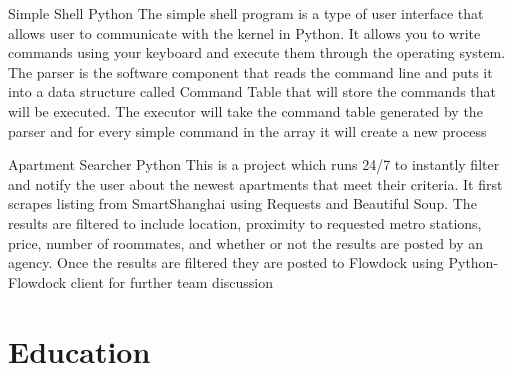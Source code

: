 \documentclass[11pt,a4paper]{moderncv}
\begin{document}
\vspace*{0.2\baselineskip}
\cventry{}
{Simple Shell}
{Python}
{}{}
{
The simple shell program is a type of user interface that allows user to communicate with the kernel in Python. It allows you to write commands using your keyboard and execute them through the operating system. The parser is the software component that reads the command line and puts it into a data structure called Command Table that will store the commands that will be executed. The executor will take the command table generated by the parser and for every simple command in the array it will create a new process
}




\vspace*{0.2\baselineskip}
\cventry{}
{Apartment Searcher}
{Python}
{}{}
{
This is a project which runs 24/7 to instantly filter and notify the user about the newest apartments that meet their criteria. It first scrapes listing from SmartShanghai using Requests and Beautiful Soup. The results are filtered to include location, proximity to requested metro stations, price, number of roommates, and whether or not the results are posted by an agency. Once the results are filtered they are posted to Flowdock using Python-Flowdock client for further team discussion
}

\section{Education}
\end{document}
